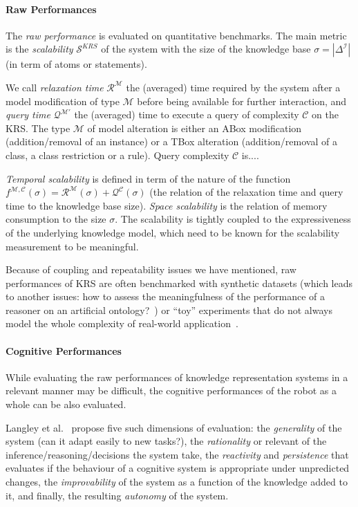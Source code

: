 \paragraph{Raw Performances} The \emph{raw performance} is evaluated on
quantitative benchmarks. The main metric is the \emph{scalability}
$\mathcal{S}^{KRS}$ of the system with the size of the knowledge base
$\sigma=|\Delta^{\mathcal{I}}|$  (in term of atoms or statements).

We call \emph{relaxation time} $\mathcal{R}^{\mathcal{M}}$ the (averaged) time
required by the system after a model modification of type $\mathcal{M}$ before
being available for further interaction, and \emph{query time}
$\mathcal{Q}^{\mathcal{M}'}$ the (averaged) time to execute a query of
complexity $\mathcal{C}$ on the KRS. The type $\mathcal{M}$ of model
alteration is either an ABox modification (addition/removal of an instance) or
a TBox alteration (addition/removal of a class, a class restriction or a rule).
Query complexity $\mathcal{C}$ is....

\emph{Temporal scalability} is defined in term of the nature of the function
$f^{\mathcal{M}, \mathcal{C}}(\sigma) = \mathcal{R}^{\mathcal{M}}(\sigma) +
\mathcal{Q}^{\mathcal{C}}(\sigma)$ (\ie the relation of the relaxation time
and query time to the knowledge base size). \emph{Space scalability} is the
relation of memory consumption to the size $\sigma$. The scalability is tightly
coupled to the expressiveness of the underlying knowledge model, which need to
be known for the scalability measurement to be meaningful.

Because of coupling and repeatability issues we have mentioned, raw
performances of KRS are often benchmarked with synthetic datasets (which leads
to another issues: how to assess the meaningfulness of the performance of a
reasoner on an artificial ontology?~\cite{Bail2010}) or ``toy'' experiments
that do not always model the whole complexity of real-world
application~\cite{Chong2009}.

\paragraph{Cognitive Performances} While evaluating the raw performances of
knowledge representation systems in a relevant manner may be difficult, the cognitive
performances of the robot as a whole can be also evaluated.

Langley et al.~\cite{Langley2006} propose five such dimensions of evaluation:
the \emph{generality} of the system (can it adapt easily to new tasks?), the
\emph{rationality} or relevant of the inference/reasoning/decisions the system
take, the \emph{reactivity} and \emph{persistence} that evaluates if the
behaviour of a cognitive system is appropriate under unpredicted changes, the
\emph{improvability} of the system as a function of the knowledge added to it,
and finally, the resulting \emph{autonomy} of the system.

